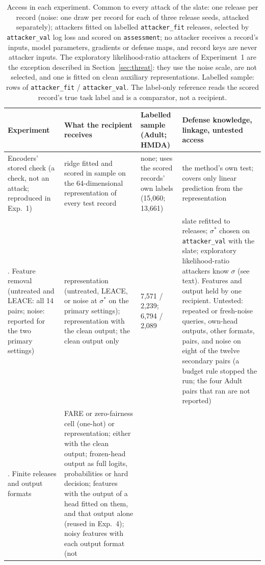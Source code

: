 \documentclass[10pt]{article}
\begin{document}
\begin{table}[!tbp]
\centering\footnotesize
\caption{Access in each experiment. Common to every attack of the slate: one release per record (noise: one draw per record for each
of three release seeds, attacked separately); attackers fitted on labelled \texttt{attacker\_fit} releases, selected by
\texttt{attacker\_val} log loss and scored on \texttt{assessment}; no attacker receives a record's inputs, model
parameters, gradients or defense maps, and record keys are never attacker inputs. The exploratory likelihood-ratio
attackers of Experiment~1 are the exception described in Section~\ref{sec:threat}: they use the noise scale, are not
selected, and one is fitted on clean auxiliary representations. Labelled sample: rows of
\texttt{attacker\_fit} / \texttt{attacker\_val}. The label-only reference reads the scored record's true task label and
is a comparator, not a recipient.}\label{tab:access}
\begin{tabular}{@{}L{2.2cm}L{4.6cm}L{2.5cm}L{5.6cm}@{}}
\toprule
Experiment & What the recipient receives & Labelled sample (Adult; HMDA) & Defense knowledge, linkage, untested access\\
\midrule
Encoders' stored check (a check, not an attack; reproduced in Exp.~1) & ridge fitted and scored in sample on the
64-dimensional representation of every test record & none; uses the scored records' own labels (15{,}060; 13{,}661) &
the method's own test; covers only linear prediction from the representation\\
. Feature removal (untreated and LEACE: all 14 pairs; noise: reported for the two primary settings) & representation (untreated, LEACE,
or noise at $\sigma^*$ on the primary settings); representation with the clean output; the clean output only & 7{,}571 / 2{,}239; 6{,}794 / 2{,}089 & slate refitted to releases;
$\sigma^*$ chosen on \texttt{attacker\_val} with the slate; exploratory likelihood-ratio attackers know $\sigma$ (see
text). Features and output held by one recipient. Untested: repeated or fresh-noise queries, own-head outputs, other
formats, pairs, and noise on eight of the twelve secondary pairs (a budget rule stopped the run; the four Adult pairs that ran are not
reported)\\
. Finite releases and output formats & FARE or zero-fairness cell (one-hot) or representation; either with the clean output; frozen-head output as full logits, probabilities or hard decision; features with the
output of a head fitted on them, and that output alone (reused in Exp.~4); noisy features with each output format (not

\end{tabular}
\end{table}
\end{document}
